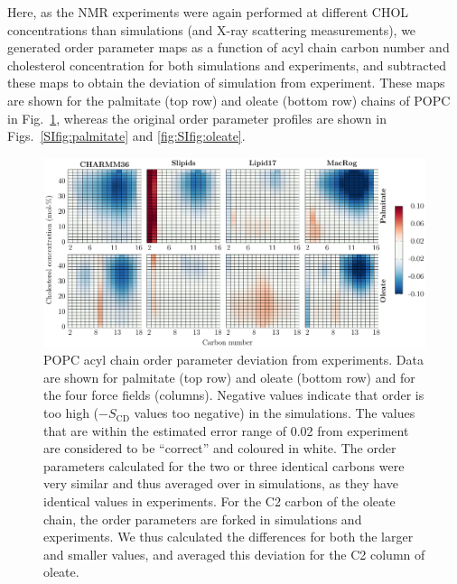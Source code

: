 \documentclass[journal=jctcce]{achemso}
\begin{document}
Here, as the NMR experiments \cite{ferreira13} were again performed at different CHOL concentrations than simulations (and X-ray scattering measurements), we generated order parameter maps as a function of acyl chain carbon number and cholesterol concentration for both simulations and experiments, and subtracted these maps to obtain the deviation of simulation from experiment. These maps are shown for the palmitate (top row) and oleate (bottom row) chains of POPC in Fig.~\ref{fig:OPmaps}, whereas the original order parameter profiles are shown in Figs.~\ref{SIfig:palmitate} and \ref{fig:SIfig:oleate}.

\begin{figure}[htb!]
  \centering
  \includegraphics[width=\linewidth]{../FIGS/OP_chains.pdf}
  \caption{\label{fig:OPmaps}%
  POPC acyl chain order parameter deviation from experiments. Data are shown for palmitate (top row) and oleate (bottom row) and for the four force fields (columns). Negative values indicate that order is too high ($-S_\mathrm{CD}$ values too negative) in the simulations. The values that are within the estimated error range of 0.02 from experiment are considered to be ``correct'' and coloured in white. The order parameters calculated for the two or three identical carbons were very similar and thus averaged over in simulations, as they have identical values in experiments. For the C2 carbon of the oleate chain, the order parameters are forked in simulations and experiments. We thus calculated the differences for both the larger and smaller values, and averaged this deviation for the C2 column of oleate.
  }
\end{figure}
\end{document}
